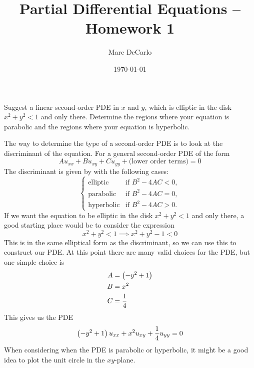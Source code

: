 \documentclass[12pt]{article}
\title{Partial Differential Equations -- Homework 1}
\author{Marc DeCarlo}
\date{\today}
\begin{document}
\maketitle

Suggest a linear second-order PDE in $x$ and $y$, which is elliptic in the disk $x^2 + y^2 < 1$ and only there. Determine the regions where your equation is parabolic and the regions where your equation is hyperbolic.

\sol
The way to determine the type of a second-order PDE is to look at the discriminant of the equation. For a general second-order PDE of the form
\[
A u_{xx} + B u_{xy} + C u_{yy} + \text{(lower order terms)} = 0
\]
The discriminant is given by with the following cases:
\[
\begin{cases}
\text{elliptic} & \text{if } B^2 - 4AC < 0, \\
\text{parabolic} & \text{if } B^2 - 4AC = 0, \\
\text{hyperbolic} & \text{if } B^2 - 4AC > 0.
\end{cases}
\]
If we want the equation to be elliptic in the disk $x^2 + y^2 < 1$ and only there, a good starting place would be to consider the expression
\[
x^2 + y^2 < 1 \implies x^2 + y^2 - 1 < 0
\]
This is in the same elliptical form as the discriminant, so we can use this to construct our PDE. At this point there are many valid choices for the PDE, but one simple choice is
\begin{align*}
    A &= \left( -y^2+1 \right) \\
    B &= x^2 \\
    C &= \frac{1}{4}
\end{align*}
This gives us the PDE
\[
\left( -y^2+1 \right) u_{xx} + x^2 u_{xy} + \frac{1}{4} u_{yy} = 0
\]
When considering when the PDE is parabolic or hyperbolic, it might be a good idea to plot the unit circle in the $xy$-plane.
\end{document}
